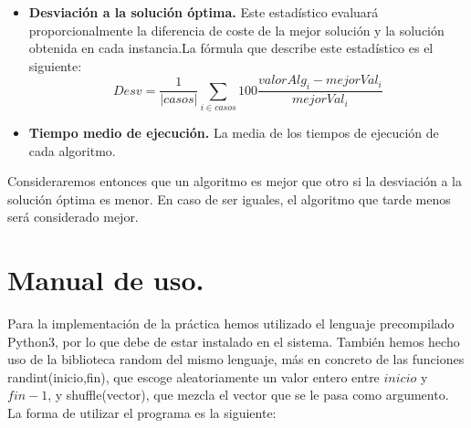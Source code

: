 \begin{itemize}
	\item \textbf{Desviación a la solución óptima.} Este estadístico evaluará proporcionalmente la diferencia de coste de la mejor solución y la solución obtenida en cada instancia.La fórmula que describe este estadístico es el siguiente:
	\[Desv = \dfrac{1}{ \left| casos\right|}\sum_{i \in casos}100\dfrac{valorAlg_i - mejorVal_i}{mejorVal_i} \]
	
	\item \textbf{Tiempo medio de ejecución.} La media de los tiempos de ejecución de cada algoritmo.
\end{itemize}

Consideraremos entonces que un algoritmo es mejor que otro si la desviación a la solución óptima es menor. En caso de ser iguales, el algoritmo que tarde menos será considerado mejor.

\newpage

\section{Manual de uso.}

Para la implementación de la práctica hemos utilizado el lenguaje precompilado Python3, por lo que debe de estar instalado en el sistema. También hemos hecho uso de la biblioteca random del mismo lenguaje, más en concreto de las funciones randint(inicio,fin), que escoge aleatoriamente un valor entero entre  $inicio$ y $fin-1$, y shuffle(vector), que mezcla el vector que se le pasa como argumento.\\

La forma de utilizar el programa es la siguiente:\\

